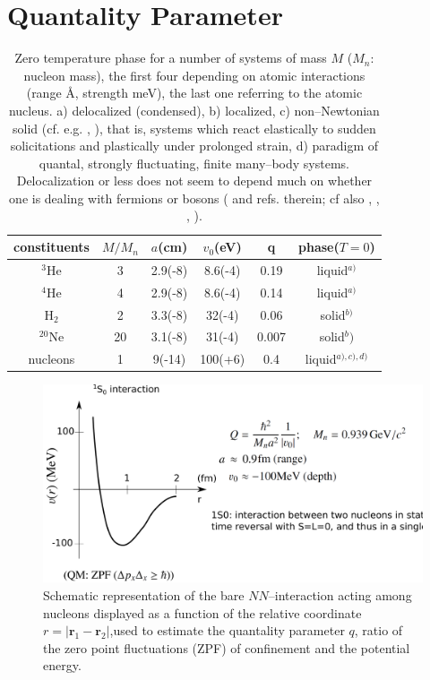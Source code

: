 \section{Quantality Parameter}\label{App1A}
\begin{table}
 \begin{tabular}{|c|c|c|c|c|c|}
 \hline \rule[-2ex]{0pt}{5.5ex}   constituents& $M/M_n$  & $a$(cm) &$v_0$(eV)  &q&phase($T=0$)    \\ 
 \hline \rule[-2ex]{0pt}{5.5ex}   $^{3}$He &3& 2.9(-8)  &8.6(-4)  &0.19  &liquid$^{a)}$    \\ 
 \hline \rule[-2ex]{0pt}{5.5ex}  $^{4}$He  &4&  2.9(-8)&  8.6(-4)&  0.14& liquid$^{a)}$   \\ 
 \hline \rule[-2ex]{0pt}{5.5ex}    H$_2$&2&  3.3(-8)&  32(-4)&  0.06&solid$^{b)}$   \\ 
 \hline \rule[-2ex]{0pt}{5.5ex}    $^{20}$Ne&20& 3.1(-8) &  31(-4)&  0.007&solid$^b)$    \\ 
 \hline \rule[-2ex]{0pt}{5.5ex}    nucleons&1&  9(-14)& 100(+6) &  0.4&liquid$^{a),c),d)}$  \\ 
 \hline 
 \end{tabular}
 \caption{Zero temperature phase for a number of systems of mass $M$ ($M_n$: nucleon mass), the first four depending on atomic interactions (range \AA, strength meV), the last one referring to the atomic nucleus. a) delocalized (condensed), b) localized, c) non--Newtonian solid (cf. e.g. \cite{Bertsch:88b}, \cite{DeGennes:94}), that is, systems which react elastically to sudden solicitations and plastically under prolonged strain, d) paradigm of quantal, strongly fluctuating, finite many--body  systems. Delocalization or less does not seem to depend much on whether one is dealing with fermions or bosons (\cite{Mottelson:02} and refs. therein; cf also \cite{Ebran:14}, \cite{Ebran:14b}, \cite{Ebran:13}, \cite{Ebran:12}).}\label{tab1A1}
 \end{table}
 \begin{figure}[h!]
 \centerline{\includegraphics*[width=\textwidth,angle=0]{nutshell/figs/potential.pdf}}
 \caption{Schematic representation of the bare $NN$--interaction acting among nucleons displayed as a function of the relative coordinate $r=|\mathbf{r}_1-\mathbf{r}_2|$,used to estimate the quantality parameter $q$, ratio of the zero point fluctuations (ZPF) of confinement and the potential energy.}\label{fig1A1}
 \end{figure}
